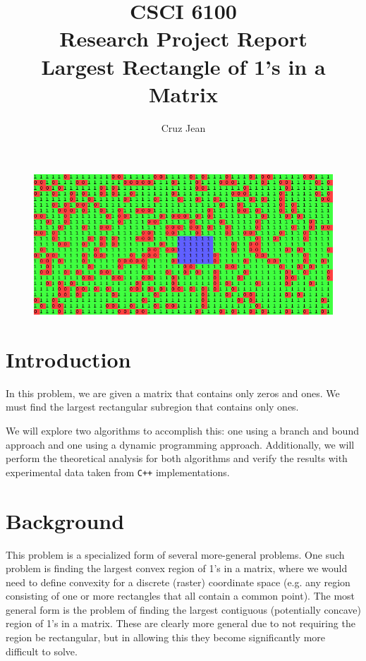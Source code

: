 \documentclass{article}
\begin{document}
\title{CSCI 6100 \protect\\ Research Project Report \protect\\ Largest Rectangle of 1's in a Matrix}
\author{Cruz Jean}
\maketitle

\FloatBarrier
\begin{figure}[!ht]
\centering
\includegraphics[width=140mm]{titleImage.png}
\end{figure}
\FloatBarrier

\pagebreak
\section{Introduction}

In this problem, we are given a matrix that contains only zeros and ones.
We must find the largest rectangular subregion that contains only ones.

We will explore two algorithms to accomplish this: one using a branch and bound approach and one using a dynamic programming approach.
Additionally, we will perform the theoretical analysis for both algorithms and verify the results with experimental data taken from \texttt{C++} implementations.


\section{Background}

This problem is a specialized form of several more-general problems.
One such problem is finding the largest convex region of 1's in a matrix, where we would need to define convexity for a discrete (raster) coordinate space (e.g. any region consisting of one or more rectangles that all contain a common point).
The most general form is the problem of finding the largest contiguous (potentially concave) region of 1's in a matrix.
These are clearly more general due to not requiring the region be rectangular, but in allowing this they become significantly more difficult to solve.
\end{document}
